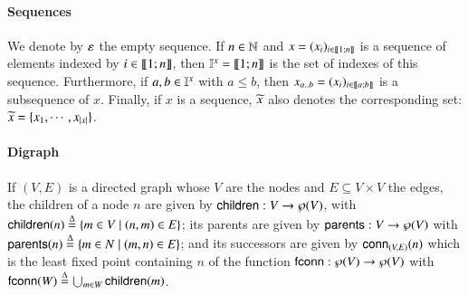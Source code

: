 \paragraph*{Sequences}
We denote by $\varepsilon$ the empty sequence.
If $n \in \mathbb{N}$ and
$x = (x_i)_{i \in \llbracket 1; n \rrbracket}$ is a sequence of elements indexed by $i \in \llbracket 1; n \rrbracket$,
then $\mathbb{I}^{x} = \llbracket 1; n \rrbracket$ is the set of indexes of this sequence.
Furthermore, if $a, b \in \mathbb{I}^{x}$ with $a \leq b$,
then $x_{a..b} = (x_i)_{i \in \llbracket a; b \rrbracket}$ is a subsequence of $x$.
Finally, if $x$ is a sequence, $\widetilde{x}$ also denotes the corresponding set:
$\widetilde{x} = \{x_1, \cdots, x_{|x|}\}$.

\paragraph*{Digraph}
If $(V,E)$ is a directed graph whose $V$ are the nodes and $E \subseteq V\times V$ the edges,
the children of a node $n$ are given by
$\mathsf{children}: V \to \wp(V)$, with
$\mathsf{children}(n) \stackrel{\Delta}= \{ m\in V\mid (n,m)\in E\}$;
its parents are given by
$\mathsf{parents}: V \to \wp(V)$ with
$\mathsf{parents}(n) \stackrel{\Delta}= \{ m\in N\mid (m,n)\in E\}$;
and its successors are given by
$\mathsf{conn}_{(V,E)}(n)$ which is the least fixed point containing $n$
of the function
$\mathsf{f}\mathsf{conn}:\wp(V)\to \wp(V)$
with $\mathsf{f}\mathsf{conn}(W) \stackrel{\Delta}= \bigcup_{m\in W} \mathsf{children}(m)$.


